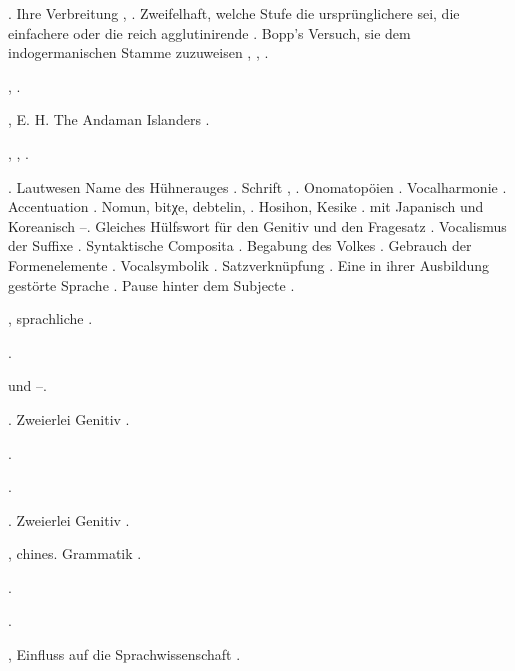\begin{register}
. Ihre Verbreitung \pageref{sp.142}, \pageref{sp.147}. Zweifelhaft, welche Stufe die ursprünglichere sei, die einfachere oder die reich agglutinirende \pageref{sp.257}. Bopp’s Versuch, sie dem indogermanischen Stamme zuzuweisen \pageref{sp.144}, \pageref{sp.155}, \pageref{sp.266}.


,  \pageref{sp.147}.

, E. H. The Andaman Islanders \pageref{sp.442}. 

,  \pageref{sp.150}, \pageref{sp.282}.

. Lautwesen \pageref{sp.34} Name des Hühnerauges \pageref{sp.41}. Schrift \pageref{sp.129}, \pageref{sp.131}. Onomatopöien \pageref{sp.154}. Vocalharmonie \pageref{sp.199}. Accentuation \pageref{sp.212}. Nomun, bitχe, debtelin,  \pageref{sp.264}. Hosihon, Kesike \pageref{sp.267}.  mit Japanisch und Koreanisch \pageref{sp.289}–\pageref{sp.290}. Gleiches Hülfswort für den Genitiv und den Fragesatz \pageref{sp.347}. Vocalismus der Suffixe \pageref{sp.352}. Syntaktische Composita \pageref{sp.359}. Begabung des Volkes \pageref{sp.389}. Gebrauch der Formenelemente \pageref{sp.381}. Vocalsymbolik \pageref{sp.408}. Satzverknüpfung \pageref{sp.418}. Eine in ihrer Ausbildung gestörte Sprache \pageref{sp.427}. Pause hinter dem Subjecte \pageref{sp.455}.

, sprachliche \pageref{sp.275}.

 \pageref{sp.257}.

 und  \pageref{sp.248}–\pageref{sp.249}.

. Zweierlei Genitiv \pageref{sp.463}.

 \pageref{sp.280}.

 \pageref{sp.280}.

. Zweierlei Genitiv \pageref{sp.463}.


, chines. Grammatik \pageref{sp.25}.

 \pageref{sp.22}.

 \pageref{sp.107}.

, Einfluss auf die Sprachwissenschaft \pageref{sp.15}.


\end{register}
